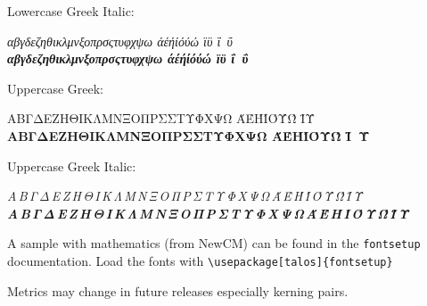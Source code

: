 \documentclass[a4paper]{article}
\begin{document}
Lowercase Greek Italic:
\begin{center}
  \textit{αβγδεζηθικλμνξοπρσςτυφχψω άέήίόύώ ϊϋ ΐ\ ΰ}\\
   \textit{\bfseries αβγδεζηθικλμνξοπρσςτυφχψω άέήίόύώ ϊϋ ΐ\ ΰ}
\end{center}

Uppercase Greek:
\begin{center}
  ΑΒΓΔΕΖΗΘΙΚΛΜΝΞΟΠΡΣΣΤΥΦΧΨΩ ΆΈΉΊΌΎΏ ΪΫ\\
  \textbf{ΑΒΓΔΕΖΗΘΙΚΛΜΝΞΟΠΡΣΣΤΥΦΧΨΩ ΆΈΉΊΌΎΏ Ϊ\ Ϋ}
\end{center}

Uppercase Greek Italic:
\begin{center}
  \textit{Α\,Β\,Γ\,Δ\,Ε\,Ζ\,Η\,Θ\,Ι\,Κ\,Λ\,Μ\,Ν\,Ξ\,Ο\,Π\,Ρ\,Σ\,Τ\,Υ\,Φ\,Χ\,Ψ\,Ω\,Ά\,Έ\,Ή\,Ί\,Ό\,Ύ\,Ώ\,Ϊ\,Ϋ}\\
   \textit{\bfseries Α\,Β\,Γ\,Δ\,Ε\,Ζ\,Η\,Θ\,Ι\,Κ\,Λ\,Μ\,Ν\,Ξ\,Ο\,Π\,Ρ\,Σ\,Τ\,Υ\,Φ\,Χ\,Ψ\,Ω\,Ά\,Έ\,Ή\,Ί\,Ό\,Ύ\,Ώ\,Ϊ\,Ϋ}
\end{center}
A sample with mathematics (from NewCM) can be found in the \verb|fontsetup| documentation.
Load the fonts with \verb|\usepackage[talos]{fontsetup}|

Metrics may change in future releases especially kerning pairs.
\end{document}
